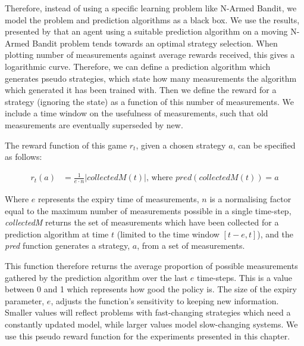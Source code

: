 Therefore, instead of using a specific learning problem like N-Armed Bandit, we model the problem and
prediction algorithms as a black box. We use the results, presented by
\citet[p.43]{Sutton1998} that an agent using a suitable prediction algorithm
on a moving N-Armed Bandit problem tends towards an optimal strategy
selection. When plotting number of measurements against average rewards
received, this gives a logarithmic curve. Therefore, we can define a
prediction algorithm which generates pseudo strategies, which state how many
measurements the algorithm which generated it has been trained with. Then we
define the reward for a strategy (ignoring the state) as a
function of this number of measurements. We include a time window on the
usefulness of measurements, such that old measurements are eventually
superseded by new.

The reward function of this game $r_t$, given a chosen strategy $a$, can be specified as follows:

\begin{align*}
r_t \left(a\right) &= \frac{1}{e\cdot n} \left|  \mathit{collectedM}\left(t\right)\right| \text{, where } \mathit{pred}\left( \mathit{collectedM}\left(t\right)\right)=a
\end{align*}

Where $e$ represents the expiry time of measurements, $n$ is a normalising
factor equal to the maximum number of measurements possible in a single time-step,
\emph{collectedM} returns the set of measurements which have been
collected for a prediction algorithm at time $t$ (limited to the time window
$[t-e,t]$), and the \emph{pred} function generates a strategy, $a$, from a set
of measurements.

This function therefore returns the average proportion of possible measurements gathered by the prediction algorithm over the last $e$ time-steps. This is a value between 0 and 1 which represents how good the
policy is. The size of the expiry parameter, $e$, adjusts the
function's sensitivity to keeping new information. Smaller values will reflect
problems with fast-changing strategies which need a constantly updated model,
while larger values model slow-changing systems. We use this pseudo reward function for the experiments presented in this chapter.

